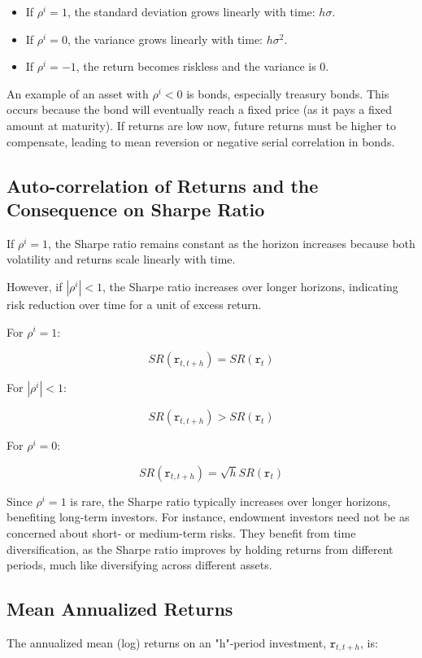 \documentclass{article}
\begin{document}
\begin{itemize}
    \item If \( \rho^i = 1 \), the standard deviation grows linearly with time: \( h\sigma \).
    \item If \( \rho^i = 0 \), the variance grows linearly with time: \( h\sigma^2 \).
    \item If \( \rho^i = -1 \), the return becomes riskless and the variance is 0.
\end{itemize}

An example of an asset with \( \rho^i < 0 \) is bonds, especially treasury bonds. This occurs because the bond will eventually reach a fixed price (as it pays a fixed amount at maturity). If returns are low now, future returns must be higher to compensate, leading to mean reversion or negative serial correlation in bonds.

\subsection{Auto-correlation of Returns and the Consequence on Sharpe Ratio}
If \( \rho^i = 1 \), the Sharpe ratio remains constant as the horizon increases because both volatility and returns scale linearly with time.

However, if \( |\rho^i| < 1 \), the Sharpe ratio increases over longer horizons, indicating risk reduction over time for a unit of excess return.

For \( \rho^i = 1 \):

\[
SR(\texttt{r}_{t, t+h}) = SR(\texttt{r}_{t})
\]

For \( |\rho^i| < 1 \):

\[
SR(\texttt{r}_{t, t+h}) > SR(\texttt{r}_{t})
\]

For \( \rho^i = 0 \):

\[
SR(\texttt{r}_{t, t+h}) = \sqrt{h} SR(\texttt{r}_{t})
\]

Since \( \rho^i = 1 \) is rare, the Sharpe ratio typically increases over longer horizons, benefiting long-term investors. For instance, endowment investors need not be as concerned about short- or medium-term risks. They benefit from time diversification, as the Sharpe ratio improves by holding returns from different periods, much like diversifying across different assets.

\subsection{Mean Annualized Returns}
The annualized mean (log) returns on an "h"-period investment, \( \texttt{r}_{t, t+h} \), is:
\end{document}
